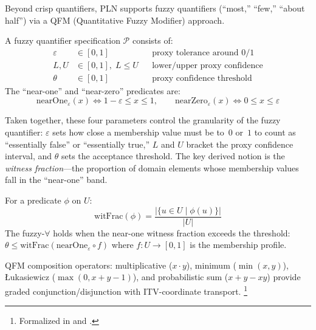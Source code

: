 \documentclass[11pt,openany]{report}
\begin{document}
Beyond crisp quantifiers, PLN supports fuzzy quantifiers (``most,''
``few,'' ``about half'') via a QFM (Quantitative Fuzzy Modifier) approach.

\begin{definition}
A fuzzy quantifier specification $\mathcal{P}$ consists of:
\begin{align}
  \varepsilon &\in [0,1] && \text{proxy tolerance around 0/1} \\
  L, U &\in [0,1],\; L \le U && \text{lower/upper proxy confidence} \\
  \theta &\in [0,1] && \text{proxy confidence threshold}
\end{align}
The ``near-one'' and ``near-zero'' predicates are:
\[
  \mathrm{nearOne}_\varepsilon(x) \iff 1 - \varepsilon \le x \le 1, \qquad
  \mathrm{nearZero}_\varepsilon(x) \iff 0 \le x \le \varepsilon
\]
\end{definition}

Taken together, these four parameters control the granularity of the
fuzzy quantifier: $\varepsilon$ sets how close a membership value must be
to~$0$ or~$1$ to count as ``essentially false'' or ``essentially true,''
$L$ and $U$ bracket the proxy confidence interval, and $\theta$ sets the
acceptance threshold.  The key derived notion is the \emph{witness
fraction}---the proportion of domain elements whose membership values
fall in the ``near-one'' band.

\begin{definition}
For a predicate $\phi$ on $U$:
\[
  \mathrm{witFrac}(\phi) = \frac{|\{u \in U \mid \phi(u)\}|}{|U|}
\]
The fuzzy-$\forall$ holds when the near-one witness fraction exceeds
the threshold: $\theta \le \mathrm{witFrac}(\mathrm{nearOne}_\varepsilon \circ f)$
where $f : U \to [0,1]$ is the membership profile.
\end{definition}

QFM composition operators: multiplicative ($x \cdot y$), minimum
($\min(x,y)$), {\L}ukasiewicz ($\max(0, x+y-1)$), and probabilistic sum
($x + y - xy$) provide graded conjunction/disjunction with ITV-coordinate
transport.%
\footnote{Formalized in 
  and .}
\end{document}
